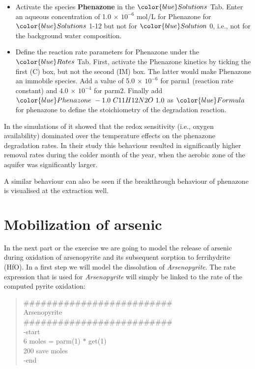 \begin{itemize}

\item Activate the species {\color{red} \textbf{Phenazone}} 
in the ${\color{blue} Solutions}$ Tab.
Enter an aqueous concentration 
of 1.0 $\times$ $10^{-6}$ mol/L for Phenazone for  
${\color{blue} Solutions}$ 1-12 but not for
${\color{blue} Solution}$ 0, i.e., 
not for the background water composition.

\item Define the reaction rate parameters for Phenazone under the 
${\color{blue} Rates}$ Tab. First, activate the Phenazone kinetics 
by ticking the first (C) box, but not the second (IM) box.
The latter would make Phenazone an immobile species.
Add a value of 5.0 $\times$ $10^{-6}$ 
for parm1 (reaction rate constant) and 
4.0 $\times$ $10^{-4}$ for parm2. Finally add \\
${\color{blue} Phenazone\ -1.0\ C11H12N2O\ 1.0}$ as ${\color{blue} Formula}$ \\
for phenazone to define the stoichiometry of the degradation reaction.

\end{itemize}

In the simulations of \cite{greskowiak_2006} it showed that 
the redox sensitivity (i.e., oxygen availability) dominated 
over the temperature effects on the phenazone degradation rates.
In their study this behaviour resulted in significantly higher 
removal rates during the colder month of the year, 
when the aerobic zone of the aquifer was significantly larger. 

A similar behaviour can also be seen if the breakthrough behaviour of 
phenazone is visualised at the extraction well.    

\section[Mobilization of arsenic]{Mobilization of arsenic}

In the next part or the exercise we are going to model the release of arsenic 
during oxidation of arsenopyrite and its subsequent sorption to ferrihydrite (HfO). 
In a first step we will model the dissolution of \emph{Arsenopyrite}. 
The rate expression that is used for \emph{Arsenopyrite} will simply be linked
to the rate of the computed pyrite oxidation:

{\color{red}
\begin{quote}
\#\#\#\#\#\#\#\#\#\#\#\#\#\#\#\#\#\#\#\#\#\#\#\#\#\#\\
Arsenopyrite \\
\#\#\#\#\#\#\#\#\#\#\#\#\#\#\#\#\#\#\#\#\#\#\#\#\#\#\\
-start \\
  6 moles = parm(1) * get(1) \\
200 save moles \\
-end \\
\end{quote}}

